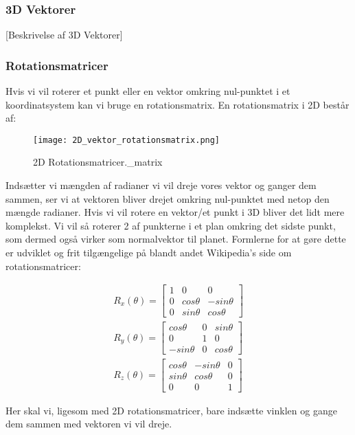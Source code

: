 \subsubsection{3D Vektorer}

[Beskrivelse af 3D Vektorer]


\subsubsection{Rotationsmatricer}
Hvis vi vil roterer et punkt eller en vektor omkring nul-punktet i et koordinatsystem kan vi bruge en rotationsmatrix\cite{rotationsmatricer}. En rotationsmatrix i 2D består af:
\begin{figure}[H]
  \centering
  \texttt{[image: 2D\_vektor\_rotationsmatrix.png]}
  \caption{2D Rotationsmatricer.\_matrix}
\end{figure}



Indsætter vi mængden af radianer vi vil dreje vores vektor og ganger dem sammen, ser vi at vektoren bliver drejet omkring nul-punktet med netop den mængde radianer. 
Hvis vi vil rotere en vektor/et punkt i 3D bliver det lidt mere komplekst. Vi vil så roterer 2 af punkterne i et plan omkring det sidste punkt, som dermed også virker som normalvektor til planet. Formlerne for at gøre dette er udviklet og frit tilgængelige på blandt andet Wikipedia's side om rotationsmatricer:


\begin{align}\label{eu_eqn}
R_x(\theta) = 
\begin{bmatrix}
1 & 0 & 0\\ 
0 & cos \theta & - sin \theta\\ 
0 & sin \theta & cos \theta
\end{bmatrix}\\
R_y(\theta) = 
\begin{bmatrix}
cos \theta  & 0 & sin \theta\\ 
0           & 1 & 0\\ 
-sin \theta & 0 & cos \theta
\end{bmatrix}\\
R_z(\theta) = 
\begin{bmatrix}
cos \theta & - sin \theta & 0\\ 
sin \theta & cos \theta & 0\\
0 & 0 & 1
\end{bmatrix}
\end{align}


Her skal vi, ligesom med 2D rotationsmatricer, bare indsætte vinklen og gange dem sammen med vektoren vi vil dreje.